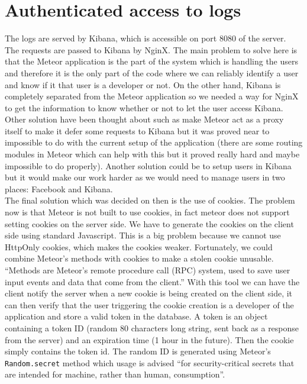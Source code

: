 \appendix
\chapter{Authenticated access to logs}\label{appendix:cookies}
The logs are served by Kibana, which is accessible on port 8080 of the server. The requests are passed to Kibana by NginX. The main problem to solve here is that the Meteor application is the part of the system which is handling the users and therefore it is the only part of the code where we can reliably identify a user and know if it that user is a developer or not. On the other hand, Kibana is completely separated from the Meteor application so we needed a way for NginX to get the information to know whether or not to let the user access Kibana.\\
Other solution have been thought about such as make Meteor act as a proxy itself to make it defer some requests to Kibana but it was proved near to impossible to do with the current setup of the application (there are some routing modules in Meteor which can help with this but it proved really hard and maybe impossible to do properly). Another solution could be to setup users in Kibana but it would make our work harder as we would need to manage users in two places: Facebook and Kibana.\\
The final solution which was decided on then is the use of cookies. The problem now is that Meteor is not built to use cookies, in fact meteor does not support setting cookies on the server side. We have to generate the cookies on the client side using standard Javascript. This is a big problem because we cannot use HttpOnly cookies\cite{httponly}, which makes the cookies weaker. Fortunately, we could combine Meteor's methods with cookies to make a stolen cookie unusable.\\
``Methods are Meteor’s remote procedure call (RPC) system, used to save user input events and data that come from the client.'' \cite{methods} With this tool we can have the client notify the server when a new cookie is being created on the client side, it can then verify that the user triggering the cookie creation is a developer of the application and store a valid token in the database. A token is an object containing a token ID (random 80 characters long string, sent back as a response from the server) and an expiration time (1 hour in the future). Then the cookie simply contains the token id. The random ID is generated using Meteor's \texttt{Random.secret} method which usage is advised ``for security-critical secrets that are intended for machine, rather than human, consumption''\cite{meteorrandom}.\\
